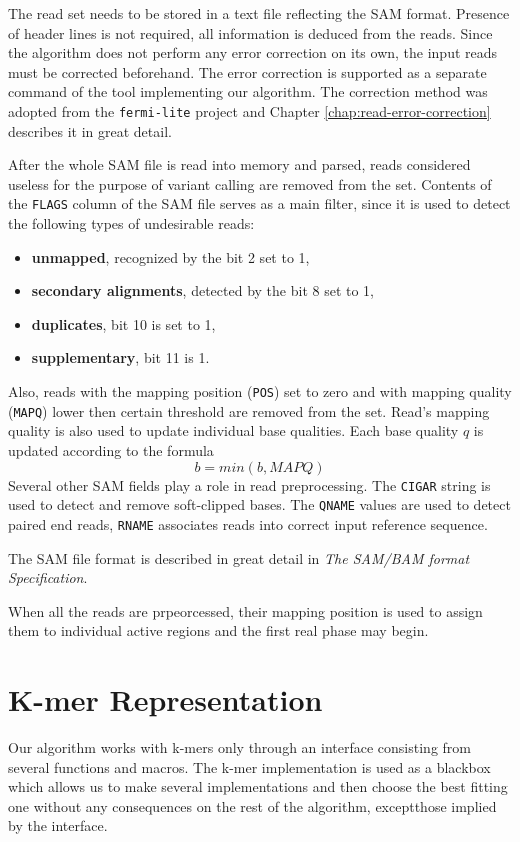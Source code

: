 The read set needs to be stored in a text file reflecting the SAM format. Presence of header lines is not required, all information is deduced from the reads. Since the algorithm does not perform any error correction on its own, the input reads must be corrected beforehand. The error correction is supported as a separate command of the tool implementing our algorithm. The correction method was adopted from the \texttt{fermi-lite} project and Chapter \ref{chap:read-error-correction} describes it in great detail.

After the whole SAM file is read into memory and parsed, reads considered useless for the purpose of variant calling are removed from the set. Contents of the \texttt{FLAGS} column of the SAM file serves as a main filter, since it is used to detect the following types of undesirable reads:
\begin{itemize}
\item \textbf{unmapped}, recognized by the bit 2 set to 1,
\item \textbf{secondary alignments}, detected by the bit 8 set to 1,
\item \textbf{duplicates}, bit 10 is set to 1,
\item \textbf{supplementary}, bit 11 is 1.
\end{itemize}

Also, reads with the mapping position (\texttt{POS}) set to zero and with mapping quality (\texttt{MAPQ}) lower then certain threshold are removed from the set. Read's mapping quality is also used to update individual base qualities. Each base quality $q$ is updated according to the formula
$$
b = min(b, MAPQ)
$$
Several other SAM fields play a role in read preprocessing. The \texttt{CIGAR} string is used to detect and remove soft-clipped bases. The \texttt{QNAME} values are used to detect paired end reads, \texttt{RNAME} associates reads into correct input reference sequence. 

The SAM file format is described in great detail in \textit{The SAM/BAM format Specification}.

When all the reads are prpeorcessed, their mapping position is used to assign them to individual active regions and the first real phase may begin.

\section{K-mer Representation}
\label{sec:kmer-representation}

Our algorithm works with k-mers only through an interface consisting from several functions and macros. The k-mer implementation is used as a blackbox which allows us to make several implementations and then choose the best fitting one without any consequences on the rest of the algorithm, exceptthose implied by the interface.

